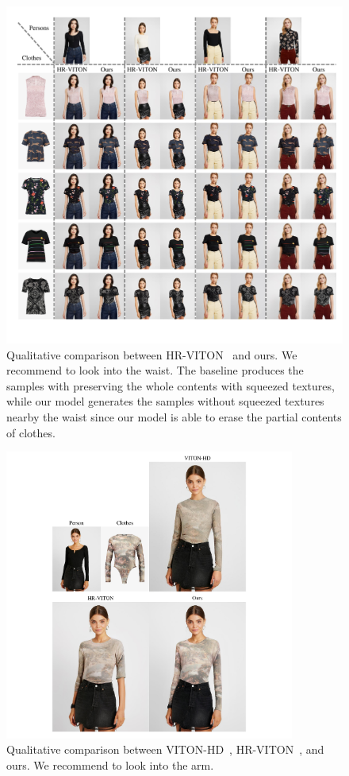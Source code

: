 \begin{figure}[t!]
    \centering
     \includegraphics[width=\textwidth]{fig_supp/fig_supp_tucked_in.pdf}
     \caption{Qualitative comparison between HR-VITON~\cite{lee2022hrviton} and ours. We recommend to look into the waist. The baseline produces the samples with preserving the whole contents with squeezed textures, while our model generates the samples without squeezed textures nearby the waist since our model is able to erase the partial contents of clothes.
     }
     \label{fig_supp_tucked_in}
\end{figure}

\begin{figure}[t!]
    \centering
     \includegraphics[width=0.85\textwidth]{fig_supp/fig_suppl_HD_3.pdf}
     \caption{Qualitative comparison between VITON-HD~\cite{choi2021viton}, HR-VITON~\cite{lee2022hrviton}, and ours. We recommend to look into the arm.
     }
     \label{fig_supp_longsleeve_HR_0}
\end{figure}

